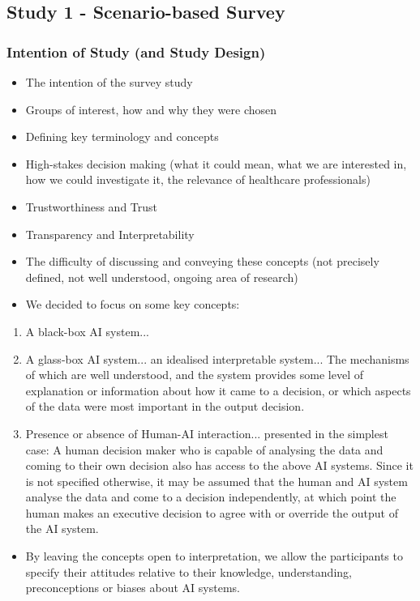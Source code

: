 \documentclass[manuscript,screen,review]{acmart}
\begin{document}

\subsection{Study 1 - Scenario-based Survey }
\subsubsection{Intention of Study (and Study Design)} 
\label{study1_intentions}


\begin{itemize}
\item The intention of the survey study
\item Groups of interest, how and why they were chosen
\item Defining key terminology and concepts
\end{itemize}
\begin{itemize}
\item High-stakes decision making (what it could mean, what we are interested in, how we could investigate it, the relevance of healthcare professionals)
\item Trustworthiness and Trust
\item Transparency and Interpretability
\end{itemize}
\begin{itemize}
\item The difficulty of discussing and conveying these concepts (not precisely defined, not well understood, ongoing area of research)
\item We decided to focus on some key concepts:
\end{itemize}
\begin{enumerate}
\item A black-box AI system...
\item A glass-box AI system... an idealised interpretable system... The mechanisms of which are well understood, and the system provides some level of explanation or information about how it came to a decision, or which aspects of the data were most important in the output decision.
\item Presence or absence of Human-AI interaction... presented in the simplest case: A human decision maker who is capable of analysing the data and coming to their own decision also has access to the above AI systems. Since it is not specified otherwise, it may be assumed that the human and AI system analyse the data and come to a decision independently, at which point the human makes an executive decision to agree with or override the output of the AI system.  
\end{enumerate}
\begin{itemize}
\item By leaving the concepts open to interpretation, we allow the participants to specify their attitudes relative to their knowledge, understanding, preconceptions or biases about AI systems. 
\end{itemize}
 
\end{document}
